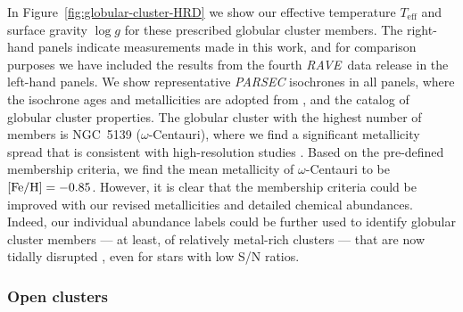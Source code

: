 \documentclass[preprint]{aastex61}
\newcommand{\acronym}[1]{{\small{#1}}}
\newcommand{\project}[1]{\textsl{#1}}
\newcommand{\rave}{\project{\acronym{RAVE}}}
\newcommand{\teff}{T_{\mathrm{eff}}}
\newcommand{\logg}{\log g}
\begin{document}
In Figure~\ref{fig:globular-cluster-HRD} we show our effective temperature
$\teff$ and surface gravity $\logg$ for these prescribed globular cluster members.
The right-hand panels indicate measurements made in this work, and for comparison 
purposes we have included the results from the fourth \rave\ data release in the 
left-hand panels.  We show representative \project{PARSEC} isochrones 
\citep{Bressan_2012} in all panels, where the isochrone ages and metallicities 
are adopted from \citet{Kunder_2016,Marin-Franch_2009}, and the 
\citet[][accessed 6 September 2016]{Harris_1996} catalog of globular 
cluster properties.  The globular cluster with the highest number of members is 
NGC~5139 ($\omega$-Centauri), where we find a significant metallicity spread
that is consistent with high-resolution studies \citep{Marino_2011,Carretta_2009,
Carretta_2013}. Based on the pre-defined membership criteria, we find the mean 
metallicity of $\omega$-Centauri to be $[{\rm Fe/H}] = -0.85$.  However, it 
is clear that the membership criteria could be improved with our revised 
metallicities and detailed chemical abundances.  Indeed, our individual abundance
labels could be further used to identify globular cluster members --- at least, of
relatively metal-rich clusters ---  that are now tidally disrupted 
\citep{Anguiano_2016,Kuzma_2016,Navin_2016}, even for stars with low S/N ratios.


\subsubsection{Open clusters}
\label{sec:open-cluster-validation}
\end{document}
